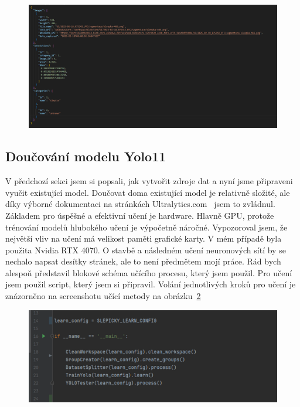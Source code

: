 \begin{figure}[H]
    \centering
    \includegraphics[width=1.0\textwidth]{img/coco_format}
    \label{fig:coco_format}
\end{figure}

\subsection*{Doučování modelu Yolo11}\label{subsec:doucovani-modelu-yolov11-o-novou-tridu}
V předchozí sekci jsem si popsali, jak vytvořit zdroje dat a nyní jsme připraveni vyučit existující model.
Doučovat doma existující model je relativně složité, ale díky výborné dokumentaci na stránkách Ultralytics.com~\cite{ultralytics_yolo} jsem to zvládnul.
Základem pro úspěšné a efektivní učení je hardware.
Hlavně GPU, protože trénování modelů hlubokého učení je výpočetně náročné.
Vypozoroval jsem, že největší vliv na učení má velikost paměti grafické karty.
V mém případě byla použita Nvidia RTX 4070.
O stavbě a následném učení neuronových sítí by se nechalo napsat desítky stránek, ale to není předmětem mojí práce.
Rád bych alespoň představil blokové schéma učícího procesu, který jsem použil.\newline
\newline
Pro učení jsem použil script, který jsem si připravil.
Volání jednotlivých kroků pro učení je znázorněno na screenshotu učící metody na obrázku~\ref{fig:learn_script}

\begin{figure}[H]
    \centering
    \includegraphics[width=1.0\textwidth]{img/learn_script}
    \label{fig:learn_script}
\end{figure}

